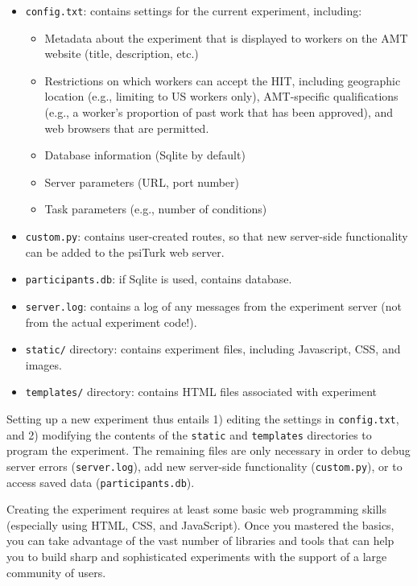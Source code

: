 \documentclass[twocolumn]{svjour3}          %
\begin{document}
\begin{itemize}
\item \texttt{config.txt}: contains settings for the current experiment, including:

\begin{itemize}
\item Metadata about the experiment that is displayed to workers on the AMT website (title, description, etc.)
\item Restrictions on which workers can accept the HIT, including geographic location (e.g., limiting to US workers only), AMT-specific qualifications (e.g., a worker's proportion of past work that has been approved), and web browsers that are permitted.
\item Database information (Sqlite by default)
\item Server parameters (URL, port number)
\item Task parameters (e.g., number of conditions)
\end{itemize}


\item \texttt{custom.py}: contains user-created routes, so that new server-side functionality can be added to the psiTurk web server. 

\item \texttt{participants.db}: if Sqlite is used, contains database.

\item \texttt{server.log}: contains a log of any messages from the experiment server (not from the actual experiment code!).

\item \texttt{static/} directory: contains experiment files, including Javascript, CSS, and images.

\item \texttt{templates/} directory: contains HTML files associated with experiment 
\end{itemize}

Setting up a new experiment thus entails 1) editing the settings in \texttt{config.txt}, and 2) modifying the contents of the \texttt{static} and \texttt{templates} directories to program the experiment.
The remaining files are only necessary in order to debug server errors (\texttt{server.log}), add new server-side functionality (\texttt{custom.py}), or to access saved data (\texttt{participants.db}).

Creating the experiment requires at least some basic web programming skills (especially using HTML, CSS, and JavaScript).
Once you mastered the basics, you can take advantage of the vast number of libraries and tools that can help you to build sharp and sophisticated experiments with the support of a large community of users.
\end{document}
